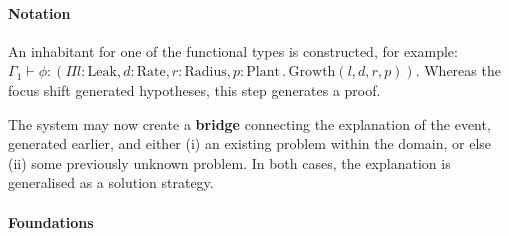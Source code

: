 \paragraph{\textbf{\upshape Notation}}

An inhabitant for one of the functional types is constructed, for
example: $\Gamma_1 \vdash \phi : (\Pi l:\mathrm{Leak},
d:\mathrm{Rate}, r:\mathrm{Radius}, p:\mathrm{Plant} \mathbin{.}
\mathrm{Growth}(l,d,r,p))$.  Whereas the focus shift generated
hypotheses, this step generates a proof.

\begin{defn}\label{def:bridge}
\hypertarget{def:bridge}{}The system may now create a \textbf{bridge}
connecting the explanation of the event, generated earlier, and either
(i) an existing problem within the domain, or else (ii) some
previously unknown problem.  In both cases, the explanation is
generalised as a solution strategy.
\end{defn}
\paragraph{\textbf{\upshape Foundations}}
                                         
